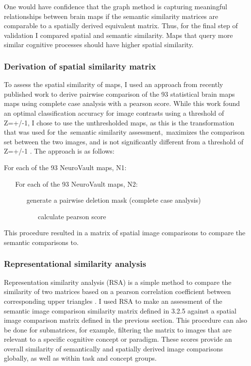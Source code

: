 \documentclass{report}
\begin{document}
One would have confidence that the graph method is capturing meaningful
relationships between brain maps if the semantic similarity matrices are
comparable to a spatially derived equivalent matrix. Thus, for the final
step of validation I compared spatial and semantic similarity. Maps that
query more similar cognitive processes should have higher spatial
similarity.

\subsubsection{Derivation of spatial similarity matrix}

To assess the spatial similarity of maps, I used an approach from
recently published work \cite{Sochat2015-qs} to derive pairwise comparison of the 93 statistical brain maps maps using
complete case analysis with a pearson score. While this work found an
optimal classification accuracy for image contrasts using a threshold of
Z=+/-1, I chose to use the unthresholded maps, as this is the
transformation that was used for the~semantic similarity
assessment,~maximizes the comparison set between the two images, and is
not significantly different from a threshold of Z=+/-1 \cite{Sochat2015-qs}.
The approach is as follows:

For each of the 93 NeuroVault maps, N1: \newline

~ ~ For each of the 93 NeuroVault maps, N2:

~ ~ ~ ~ generate a pairwise deletion mask (complete case analysis)

~ ~ ~ ~ ~ ~ calculate pearson score\newline

This procedure resulted in a matrix of spatial image comparisons to
compare the semantic comparisons to.

\subsubsection{Representational similarity analysis}

Representation similarity analysis (RSA) is a simple method to compare
the similarity of two matrices based on a pearson correlation
coefficient between corresponding upper triangles \cite{Kriegeskorte2008-kg}.
I used RSA to make an assessment of the semantic image comparison
similarity matrix defined in 3.2.5 against a spatial image comparison
matrix defined in the previous section. This procedure can also be done for
submatrices, for example, filtering the matrix to images that are
relevant to a specific cognitive concept or paradigm. These scores
provide an overall similarity of semantically and spatially derived
image comparisons globally, as well as within task and concept groups.
\end{document}

